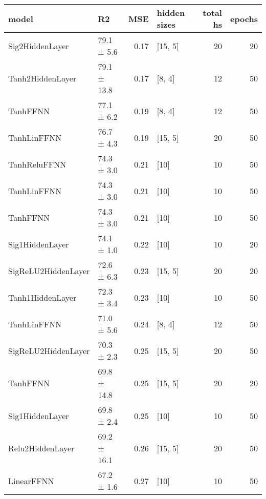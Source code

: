 \begin{longtable}{llrlrr}
\hline
 model                                      & R2          &   MSE & hidden sizes   &   total hs &   epochs \\
\hline
 \hline
Sig2HiddenLayer                     & 79.1 ± 5.6  &  0.17 & [15, 5]        &         20 &       20 \\
 \hline
Tanh2HiddenLayer                    & 79.1 ± 13.8 &  0.17 & [8, 4]         &         12 &       50 \\
 \hline
TanhFFNN                            & 77.1 ± 6.2  &  0.19 & [8, 4]         &         12 &       50 \\
 \hline
TanhLinFFNN                         & 76.7 ± 4.3  &  0.19 & [15, 5]        &         20 &       50 \\
 \hline
TanhReluFFNN                        & 74.3 ± 3.0  &  0.21 & [10]           &         10 &       50 \\
 \hline
TanhLinFFNN                         & 74.3 ± 3.0  &  0.21 & [10]           &         10 &       50 \\
 \hline
TanhFFNN                            & 74.3 ± 3.0  &  0.21 & [10]           &         10 &       50 \\
 \hline
Sig1HiddenLayer                     & 74.1 ± 1.0  &  0.22 & [10]           &         10 &       20 \\
 \hline
SigReLU2HiddenLayer                 & 72.6 ± 6.3  &  0.23 & [15, 5]        &         20 &       20 \\
 \hline
Tanh1HiddenLayer                    & 72.3 ± 3.4  &  0.23 & [10]           &         10 &       50 \\
 \hline
TanhLinFFNN                         & 71.0 ± 5.6  &  0.24 & [8, 4]         &         12 &       50 \\
 \hline
SigReLU2HiddenLayer                 & 70.3 ± 2.3  &  0.25 & [15, 5]        &         20 &       50 \\
 \hline
TanhFFNN                            & 69.8 ± 14.8 &  0.25 & [15, 5]        &         20 &       20 \\
 \hline
Sig1HiddenLayer                     & 69.8 ± 2.4  &  0.25 & [10]           &         10 &       50 \\
 \hline
Relu2HiddenLayer                    & 69.2 ± 16.1 &  0.26 & [15, 5]        &         20 &       50 \\
 \hline
LinearFFNN                          & 67.2 ± 1.6  &  0.27 & [10]           &         10 &       50 \\

\end{longtable}
